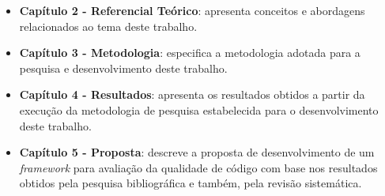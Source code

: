 \begin{itemize}
	\item \textbf{Capítulo 2 - Referencial Teórico}: apresenta conceitos e abordagens relacionados ao tema deste trabalho.

	\item \textbf{Capítulo 3 - Metodologia}: especifica a metodologia adotada para a pesquisa e desenvolvimento deste trabalho.

	\item \textbf{Capítulo 4 - Resultados}: apresenta os resultados obtidos a partir da execução da metodologia de pesquisa estabelecida para o desenvolvimento deste trabalho.

	\item \textbf{Capítulo 5 - Proposta}: descreve a proposta de desenvolvimento de um \textit{framework} para avaliação da qualidade de código com base nos resultados obtidos pela pesquisa bibliográfica e também, pela revisão sistemática.
\end{itemize}